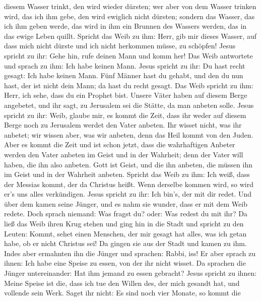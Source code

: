 diesem Wasser trinkt, den wird wieder dürsten;  wer aber
von dem Wasser trinken wird, das ich ihm gebe, den wird ewiglich nicht
dürsten; sondern das Wasser, das ich ihm geben werde, das wird in ihm
ein Brunnen des Wassers werden, das in das ewige Leben quillt.
 Spricht das Weib zu ihm: Herr, gib mir dieses Wasser, auf
dass mich nicht dürste und ich nicht herkommen müsse, zu schöpfen!
 Jesus spricht zu ihr: Gehe hin, rufe deinen Mann und komm
her!  Das Weib antwortete und sprach zu ihm: Ich habe
keinen Mann. Jesus spricht zu ihr: Du hast recht gesagt: Ich habe keinen
Mann.  Fünf Männer hast du gehabt, und den du nun hast, der
ist nicht dein Mann; da hast du recht gesagt.  Das Weib
spricht zu ihm: Herr, ich sehe, dass du ein Prophet bist. 
Unsere Väter haben auf diesem Berge angebetet, und ihr sagt, zu
Jerusalem sei die Stätte, da man anbeten solle.  Jesus
spricht zu ihr: Weib, glaube mir, es kommt die Zeit, dass ihr weder auf
diesem Berge noch zu Jerusalem werdet den Vater anbeten. 
Ihr wisset nicht, was ihr anbetet; wir wissen aber, was wir anbeten,
denn das Heil kommt von den Juden.  Aber es kommt die Zeit
und ist schon jetzt, dass die wahrhaftigen Anbeter werden den Vater
anbeten im Geist und in der Wahrheit; denn der Vater will haben, die ihn
also anbeten.  Gott ist Geist, und die ihn anbeten, die
müssen ihn im Geist und in der Wahrheit anbeten.  Spricht
das Weib zu ihm: Ich weiß, dass der Messias kommt, der da Christus
heißt. Wenn derselbe kommen wird, so wird er's uns alles verkündigen.
 Jesus spricht zu ihr: Ich bin's, der mit dir redet.
 Und über dem kamen seine Jünger, und es nahm sie wunder,
dass er mit dem Weib redete. Doch sprach niemand: Was fragst du? oder:
Was redest du mit ihr?  Da ließ das Weib ihren Krug stehen
und ging hin in die Stadt und spricht zu den Leuten: 
Kommt, sehet einen Menschen, der mir gesagt hat alles, was ich getan
habe, ob er nicht Christus sei!  Da gingen sie aus der
Stadt und kamen zu ihm.  Indes aber ermahnten ihn die
Jünger und sprachen: Rabbi, iss!  Er aber sprach zu ihnen:
Ich habe eine Speise zu essen, von der ihr nicht wisset. 
Da sprachen die Jünger untereinander: Hat ihm jemand zu essen gebracht?
 Jesus spricht zu ihnen: Meine Speise ist die, dass ich tue
den Willen des, der mich gesandt hat, und vollende sein Werk.
 Saget ihr nicht: Es sind noch vier Monate, so kommt die
